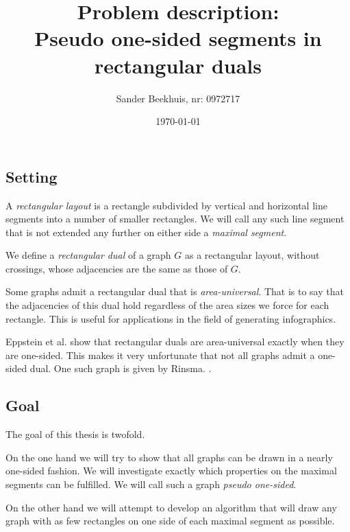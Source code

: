 \documentclass[a4paper]{article}
\title{Problem description:\\ Pseudo one-sided segments in rectangular duals}
\author{Sander Beekhuis, nr: 0972717}
\date{\today} %
\begin{document}
\maketitle

\subsection*{Setting}
A  \emph{rectangular layout} is a rectangle subdivided by vertical and horizontal line segments into a number of smaller rectangles. We will call any such line segment that is not extended any further on either side a \emph{maximal segment}.

We define a \emph{rectangular dual} of a graph $G$ as a rectangular layout, without crossings, whose adjacencies are the same as those of $G$.

Some graphs admit a rectangular dual that is \emph{area-universal}. That is to say that the adjacencies of this dual hold regardless of the area sizes we force for each rectangle. This is useful for applications in the field of generating infographics.


Eppstein et al. show that rectangular duals are area-universal exactly when they are one-sided.\cite{Eppstein2012} This makes it very unfortunate that not all graphs admit a one-sided dual. One such graph is given by Rinsma. \cite{Rinsma1987}. 

\subsection*{Goal}
The goal of this thesis is twofold.

On the one hand we will try to show that all graphs can be drawn in a nearly one-sided fashion. We will investigate exactly which properties on the {maximal segments} can be fulfilled. We will call such a graph \emph{pseudo one-sided}.

On the other hand we will attempt to develop an algorithm that will draw any graph with as few rectangles on one side of each {maximal segment} as possible.

{}

\end{document}
